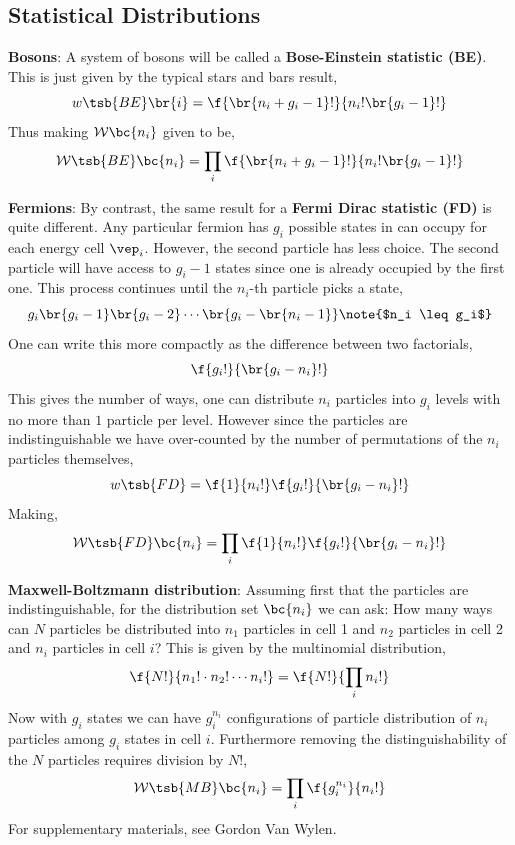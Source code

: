 \documentclass{article}
\begin{document}
{\subsection{Statistical Distributions}
\label{sec:statdist}
\textbf{Bosons}:
A system of bosons will be called a \textbf{Bose-Einstein statistic (BE)}. This is just given by the typical stars and bars result,
\[ w\tsb{BE} \br{i} = \f{\br{n_i + g_i - 1}!}{n_i !\br{g_i - 1}!} \]
Thus making $\mathcal{W}\bc{n_i}$ given to be,
\[ \mathcal{W}\tsb{BE}\bc{n_i} = \prod_{i} \f{\br{n_i + g_i - 1}!}{n_i !\br{g_i - 1}!} \]

\textbf{Fermions}:
By contrast, the same result for a \textbf{Fermi Dirac statistic (FD)} is quite different. Any particular fermion has $g_i$ possible states in can occupy for each energy cell $\vep_i$. However, the second particle has less choice. The second particle will have access to $g_i - 1$ states since one is already occupied by the first one. This process continues until the $n_i$-th particle picks a state,
\[ g_i \br{g_i - 1}\br{g_i - 2}\cdots\br{g_i - \br{n_i - 1}} \note{$n_i \leq g_i$}\]
One can write this more compactly as the difference between two factorials,
\[ \f{g_i !}{ \br{g_i - n_i}!} \]
This gives the number of ways, one can distribute $n_i$ particles into $g_i$ levels with no more than $1$ particle per level. However since the particles are indistinguishable we have over-counted by the number of permutations of the $n_i$ particles themselves,
\[ w\tsb{FD} = \f{1}{n_i!}\f{g_i !}{ \br{g_i - n_i}!} \]
Making,
\[ \mathcal{W}\tsb{FD}\bc{n_i} = \prod_{i} \f{1}{n_i!}\f{g_i !}{ \br{g_i - n_i}!} \]

\textbf{Maxwell-Boltzmann distribution}: Assuming first that the particles are indistinguishable, for the distribution set $\bc{n_i}$ we can ask: How many ways can $N$ particles be distributed into $n_1$ particles in cell 1 and $n_2$ particles in cell 2 and $n_i$ particles in cell $i$? This is given by the multinomial distribution,
\[ \f{N!}{n_1! \cdot n_2! \cdots n_i!} = \f{N!}{\prod_i n_i !} \]
Now with $g_i$ states we can have $g_i^{n_i}$ configurations of particle distribution of $n_i$ particles among $g_i$ states in cell $i$. Furthermore removing the distinguishability of the $N$ particles requires division by $N!$,
\[ \mathcal{W}\tsb{MB}\bc{n_i} = \prod_{i} \f{g_i^{n_i}}{n_i!}  \]
For supplementary materials, see Gordon Van Wylen. \\

}
\end{document}
